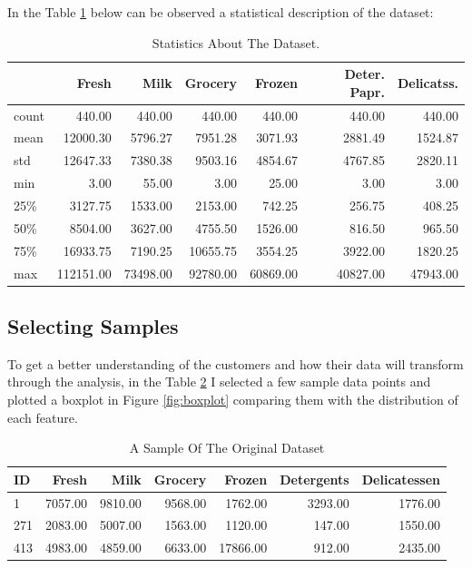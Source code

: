 \documentclass[a4paper]{article}
\begin{document}
In the Table \ref{tab:basicfacts} below can be observed a statistical description of the dataset:

\begin{table}[ht!]
\centering
\begin{tabular}{l|rrrrrr}
{} &      Fresh &      Milk &   Grocery &    Frozen & Deter. Papr. & Delicatss. \\\hline
count &     440.00 &    440.00 &    440.00 &    440.00 &           440.00 &       440.00 \\
mean  &   12000.30 &   5796.27 &   7951.28 &   3071.93 &          2881.49 &      1524.87 \\
std   &   12647.33 &   7380.38 &   9503.16 &   4854.67 &          4767.85 &      2820.11 \\
min   &       3.00 &     55.00 &      3.00 &     25.00 &             3.00 &         3.00 \\
25\%   &    3127.75 &   1533.00 &   2153.00 &    742.25 &           256.75 &       408.25 \\
50\%   &    8504.00 &   3627.00 &   4755.50 &   1526.00 &           816.50 &       965.50 \\
75\%   &   16933.75 &   7190.25 &  10655.75 &   3554.25 &          3922.00 &      1820.25 \\
max   &  112151.00 &  73498.00 &  92780.00 &  60869.00 &         40827.00 &     47943.00 \\

\end{tabular}
\caption{\label{tab:basicfacts}Statistics About The Dataset.}
\end{table}

\subsection{Selecting Samples}
\label{sec:selecting_samples}
To get a better understanding of the customers and how their data will transform through the analysis, in the Table \ref{tab:sample} I selected a few sample data points and plotted a boxplot in Figure \ref{fig:boxplot} comparing them with the distribution of each feature.

\begin{table}[ht!]
\centering
\begin{tabular}{l|rrrrrr}
{ID} &    Fresh &     Milk &  Grocery &    Frozen & Detergents & Delicatessen \\\hline
1   &  7057.00 &  9810.00 &  9568.00 &   1762.00 &          3293.00 &      1776.00 \\
271 &  2083.00 &  5007.00 &  1563.00 &   1120.00 &           147.00 &      1550.00 \\
413 &  4983.00 &  4859.00 &  6633.00 &  17866.00 &           912.00 &      2435.00 \\

\end{tabular}
\caption{\label{tab:sample}A Sample Of The Original Dataset}
\end{table}
\end{document}
